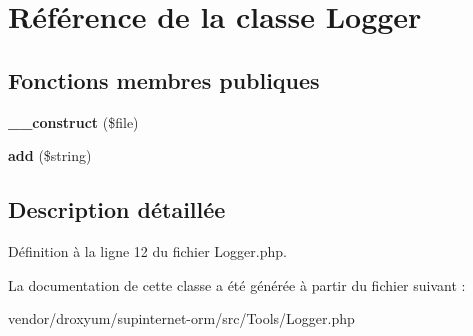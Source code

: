 \hypertarget{class_o_r_m_1_1_tools_1_1_logger}{}\section{Référence de la classe Logger}
\label{class_o_r_m_1_1_tools_1_1_logger}
\subsection*{Fonctions membres publiques}
\begin{DoxyCompactItemize}
\item 
{\bfseries \+\_\+\+\_\+construct} (\$file)\hypertarget{class_o_r_m_1_1_tools_1_1_logger_a8ef77288a5f940c68ebc57fdf0102078}{}\label{class_o_r_m_1_1_tools_1_1_logger_a8ef77288a5f940c68ebc57fdf0102078}

\item 
{\bfseries add} (\$string)\hypertarget{class_o_r_m_1_1_tools_1_1_logger_a5bee507511a1d9b607827deb279501b0}{}\label{class_o_r_m_1_1_tools_1_1_logger_a5bee507511a1d9b607827deb279501b0}

\end{DoxyCompactItemize}


\subsection{Description détaillée}


Définition à la ligne 12 du fichier Logger.\+php.



La documentation de cette classe a été générée à partir du fichier suivant \+:\begin{DoxyCompactItemize}
\item 
vendor/droxyum/supinternet-\/orm/src/\+Tools/Logger.\+php\end{DoxyCompactItemize}
